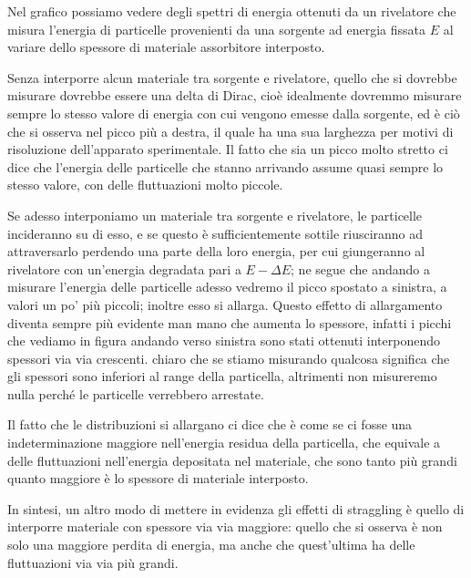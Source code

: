 Nel grafico possiamo vedere degli spettri di energia ottenuti da un rivelatore che misura l'energia di particelle provenienti da una sorgente ad energia fissata $E$ al variare dello spessore di materiale assorbitore interposto.

Senza interporre alcun materiale tra sorgente e rivelatore, quello che si dovrebbe misurare dovrebbe essere una delta di Dirac, cioè idealmente dovremmo misurare sempre lo stesso valore di energia con cui vengono emesse dalla sorgente, ed è ciò che si osserva nel picco più a destra, il quale ha una sua larghezza per motivi di risoluzione dell'apparato sperimentale. Il fatto che sia un picco molto stretto ci dice che l'energia delle particelle che stanno arrivando assume quasi sempre lo stesso valore, con delle fluttuazioni molto piccole.

Se adesso interponiamo un materiale tra sorgente e rivelatore, le particelle incideranno su di esso, e se questo è sufficientemente sottile riusciranno ad attraversarlo perdendo una parte della loro energia, per cui giungeranno al rivelatore con un'energia degradata pari a $E - \Delta E$; ne segue che andando a misurare l'energia delle particelle adesso vedremo il picco spostato a sinistra, a valori un po' più piccoli; inoltre esso si allarga. Questo effetto di allargamento diventa sempre più evidente man mano che aumenta lo spessore, infatti i picchi che vediamo in figura andando verso sinistra sono stati ottenuti interponendo spessori via via crescenti. \E chiaro che se stiamo misurando qualcosa significa che gli spessori sono inferiori al range della particella, altrimenti non misureremo nulla perché le particelle verrebbero arrestate.

Il fatto che le distribuzioni si allargano ci dice che è come se ci fosse una indeterminazione maggiore nell'energia residua della particella, che equivale a delle fluttuazioni nell'energia depositata nel materiale, che sono tanto più grandi quanto maggiore è lo spessore di materiale interposto. 

In sintesi, un altro modo di mettere in evidenza gli effetti di straggling è quello di interporre materiale con spessore via via maggiore: quello che si osserva è non solo una maggiore perdita di energia, ma anche che quest'ultima ha delle fluttuazioni via via più grandi.


